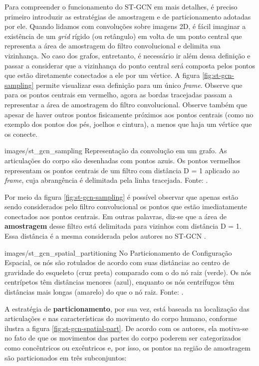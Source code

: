 Para compreender o funcionamento do ST-GCN em mais detalhes, é preciso primeiro introduzir as estratégias de amostragem e de particionamento adotadas por ele. Quando lidamos com convoluções sobre imagens 2D, é fácil imaginar a existência de um \textit{grid} rígido (ou retângulo) em volta de um ponto central que representa a área de amostragem do filtro convolucional e delimita sua vizinhança. No caso dos grafos, entretanto, é necessário ir além dessa definição e passar a considerar que a vizinhança do ponto central será composta pelos pontos que estão diretamente conectados a ele por um vértice. A figura \ref{fig:st-gcn-sampling} permite visualizar essa definição para um único \textit{frame}. Observe que para os pontos centrais em vermelho, agora as bordas tracejadas passam a representar a área de amostragem do filtro convolucional. Observe também que apesar de haver outros pontos fisicamente próximos aos pontos centrais (como no exemplo dos pontos dos pés, joelhos e cintura), a menos que haja um vértice que os conecte.

    {images/st_gcn_sampling}
    {Representação da convolução em um grafo. As articulações do corpo são desenhadas com pontos azuis. Os pontos vermelhos representam os pontos centrais de um filtro com distância D = 1 aplicado ao \textit{frame}, cuja abrangência é delimitada pela linha tracejada. Fonte: \cite[p. 5]{st-gcn-2018}.}

Por meio da figura \ref{fig:st-gcn-sampling} é possível observar que apenas estão sendo considerados pelo filtro convolucional os pontos que estão imediatamente conectados aos pontos centrais. Em outras palavras, diz-se que a área de \textbf{amostragem} desse filtro está delimitada para vizinhos com distância D = 1. Essa distância é a mesma considerada pelos autores no ST-GCN \cite{st-gcn-2018}.

    {images/st_gcn_spatial_partitioning}
    {No Particionamento de Configuração Espacial, os nós são rotulados de acordo com suas distâncias ao centro de gravidade do esqueleto (cruz preta) comparado com o do nó raiz (verde). Os nós centrípetos têm distâncias menores (azul), enquanto os nós centrífugos têm distâncias mais longas (amarelo) do que o nó raiz. Fonte: \cite[p. 5]{st-gcn-2018}.}
    
A estratégia de \textbf{particionamento}, por sua vez,  está baseada na localização das articulações e nas características do movimento do corpo humano, conforme ilustra a figura \ref{fig:st-gcn-spatial-part}. De acordo com os autores, ela motiva-se no fato de que os movimentos das partes do corpo poderem ser categorizados como concêntricos ou excêntricos e, por isso, os pontos na região de amostragem são particionados em três subconjuntos:

